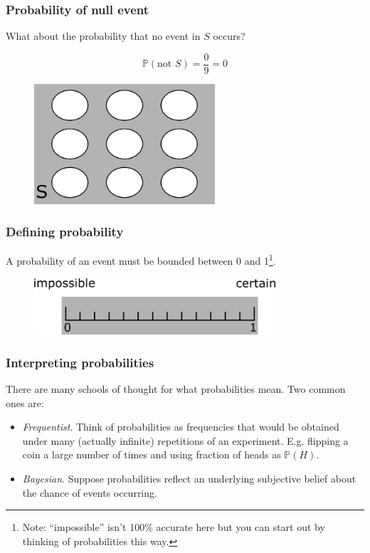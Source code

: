 \documentclass{beamer}
\begin{document}
	\begin{frame}
		\frametitle{Probability of null event}
		What about the probability that no event in $S$ occurs?
		
		\begin{equation}
			\mathbb{P}(\text{not }S) = \frac{0}{9} = 0
		\end{equation}
		
		\begin{figure}[ht]
			\centerline{\includegraphics[width=0.6\textwidth]{./figures/pebble_world_probnots.png}}
		\end{figure}
		
	\end{frame}

	\begin{frame}
		\frametitle{Defining probability}
		
		A probability of an event must be bounded between 0 and 1\footnote{Note: ``impossible'' isn't 100\% accurate here but you can start out by thinking of probabilities this way.}.
		
		\begin{figure}[ht]
			\centerline{\includegraphics[width=0.8\textwidth]{./figures/probability.png}}
		\end{figure}
		
	\end{frame}

	\begin{frame}
		\frametitle{Interpreting probabilities}
		
		There are many schools of thought for what probabilities mean. Two common ones are:
		
		\begin{itemize}
			\item \textit{Frequentist}. Think of probabilities as frequencies that would be obtained under many (actually infinite) repetitions of an experiment. E.g. flipping a coin a large number of times and using fraction of heads as $\mathbb{P}(H)$.
			\item \textit{Bayesian}. Suppose probabilities reflect an underlying subjective belief about the chance of events occurring.
		\end{itemize}
		
	\end{frame}
\end{document}
